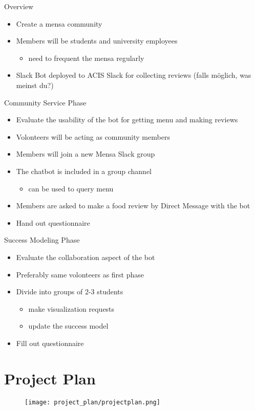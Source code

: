 \begin{frame}{Overview}
  \begin{itemize}
    \item Create a mensa community
    \item Members will be students and university employees
          \begin{itemize}
            \item need to frequent the mensa regularly %
          \end{itemize}
    \item Slack Bot deployed to ACIS Slack for collecting reviews (falls möglich, was meinst du?)
  \end{itemize}
\end{frame}

\begin{frame}{Community Service Phase}
  \begin{itemize}
    \item Evaluate the usability of the bot for getting menu and making reviews
    \item Volonteers will be acting as community members
    \item Members will join a new Mensa Slack group
    \item The chatbot is included in a group channel
          \begin{itemize}
            \item can be used to query menu
          \end{itemize}
    \item Members are asked to make a food review by Direct Message with the bot
    \item Hand out questionnaire
  \end{itemize}
\end{frame}

\begin{frame}{Success Modeling Phase}
  \begin{itemize}
    \item Evaluate the collaboration aspect of the bot
    \item Preferably same volonteers as first phase %
    \item Divide into groups of 2-3 students
          \begin{itemize}
            \item make visualization requests
            \item update the success model
          \end{itemize}
    \item Fill out questionnaire
  \end{itemize}
\end{frame}

\section{Project Plan}

\begin{frame}
  \begin{figure}
    \centering
    \texttt{[image: project\_plan/projectplan.png]}

    \label{fig:visualReq}
  \end{figure}
\end{frame}